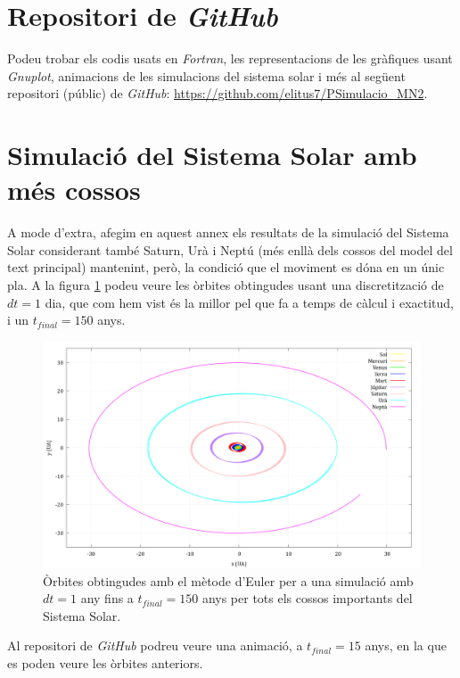 \documentclass[10pt, twoside, a4paper]{article}
\begin{document}
\section{Repositori de \textit{GitHub}}
\label{an:a}
Podeu trobar els codis usats en \textit{Fortran}, les representacions de les gràfiques usant \textit{Gnuplot}, animacions de les simulacions del sistema solar i més al següent repositori (públic) de \textit{GitHub}: \url{https://github.com/elitus7/PSimulacio_MN2}.

\section{Simulació del Sistema Solar amb més cossos}
\label{an:b}
A mode d'extra, afegim en aquest annex els resultats de la simulació del Sistema Solar considerant també Saturn, Urà i Neptú (més enllà dels cossos del model del text principal) mantenint, però, la condició que el moviment es dóna en un únic pla. A la figura \ref{fig:an1} podeu veure les òrbites obtingudes usant una discretització de $dt=1$ dia, que com hem vist és la millor pel que fa a temps de càlcul i exactitud, i un $t_{final}=150$ anys.

\begin{figure}[h]
    \centering
    \includegraphics[width=1.0\linewidth]{../sist_solar/orbites_euler_TOTS_150_d1dia.png}
    \caption{Òrbites obtingudes amb el mètode d'Euler per a una simulació amb $dt=1$ any fins a $t_{final}=150$ anys per tots els cossos importants del Sistema Solar.}
    \label{fig:an1}
\end{figure}

Al repositori de \textit{GitHub} podreu veure una animació, a $t_{final}=15$ anys, en la que es poden veure les òrbites anteriors.
\end{document}
